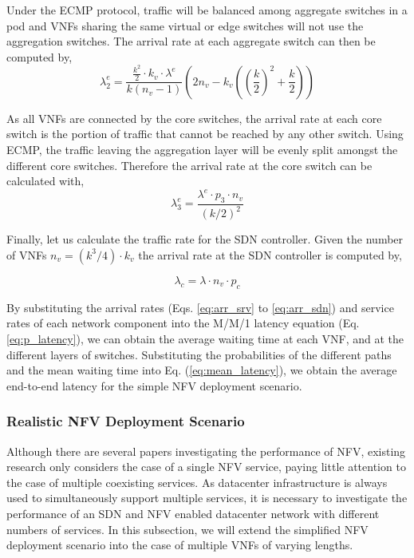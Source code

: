 Under the ECMP protocol, traffic will be balanced among aggregate switches in a pod and VNFs sharing the same virtual or edge switches will not use the aggregation switches. The arrival rate at each aggregate switch can then be computed by,
\begin{equation}
    \label{eq:arr_agg}
    \lambda_2^e = \frac{\frac{k^2}{2} \cdot k_v \cdot \lambda^e}{k(n_v - 1)}\left(2n_v - k_v \left(\left(\frac{k}{2}\right)^2 + \frac{k}{2} \right)\right)
\end{equation}

As all VNFs are connected by the core switches, the arrival rate at each core switch is the portion of traffic that cannot be reached by any other switch. Using ECMP, the traffic leaving the aggregation layer will be evenly split amongst the different core switches. Therefore the arrival rate at the core switch can be calculated with,
\begin{equation}
    \label{eq:arr_core}
    \lambda_3^e =\frac{\lambda^e \cdot p_3 \cdot n_v}{(k/2)^2}
\end{equation}

Finally, let us calculate the traffic rate for the SDN controller. Given the number of VNFs $n_v = (k^3 / 4) \cdot k_v$ the arrival rate at the SDN controller is computed by,

\begin{equation}
    \label{eq:arr_sdn}
    \lambda_c = \lambda \cdot n_v \cdot p_c
\end{equation}

By substituting the arrival rates (Eqs. \ref{eq:arr_srv} to \ref{eq:arr_sdn}) and service rates of each network component into the M/M/1 latency equation (Eq. \ref{eq:p_latency}), we can obtain the average waiting time at each VNF, and at the different layers of switches. Substituting the probabilities of the different paths and the mean waiting time into Eq. (\ref{eq:mean_latency}), we obtain the average end-to-end latency for the simple NFV deployment scenario.

\subsubsection{Realistic NFV Deployment Scenario}
\label{sec:realistic}

Although there are several papers investigating the performance of NFV, existing research only considers the case of a single NFV service, paying little attention to the case of multiple coexisting services. As datacenter infrastructure is always used to simultaneously support multiple services, it is necessary to investigate the performance of an SDN and NFV enabled datacenter network with different numbers of services. In this subsection, we will extend the simplified NFV deployment scenario into the case of multiple VNFs of varying lengths.

